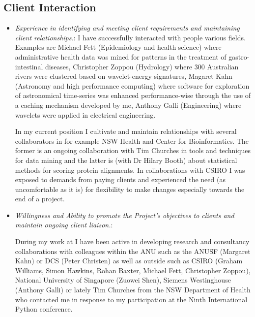 \documentclass[12pt,a4paper]{article}
\begin{document}
\subsection*{Client Interaction}
\begin{itemize} 
  \item \textit{Experience in identifying and meeting client requirements and maintaining client relationships.}:
  I have successfully interacted with people various fields.
  Examples are Michael Fett (Epidemiology and health science)
  where administrative health data was mined for patterns in the 
  treatment of gastro-intestinal diseases, 
  Christopher Zoppou (Hydrology) where 300 Australian rivers were 
  clustered based on wavelet-energy signatures,
  Magaret Kahn (Astronomy and high performance computing)
  where software for exploration of astronomical time-series was enhanced
  performance-wise through the use of a caching mechanism developed by me,
  Anthony Galli (Engineering) where wavelets were applied in 
  electrical engineering.
  
  
  In my current position I cultivate and maintain relationships with several
  collaborators in for example NSW Health and Center for Bioinformatics.
  The former is an ongoing collaboration with Tim Churches in tools and 
  techniques for data mining and the latter is (with Dr Hilary Booth) 
  about statistical methods for scoring protein alignments.
  In collaborations with CSIRO I was exposed to demands from
  paying clients and experienced the need (as uncomfortable as it is)
  for flexibility to make changes especially towards the end of a project.
  
  \item \textit{Willingness and Ability to promote the Project's objectives to clients and maintain ongoing client liaison.}:  
  
  During my work at I have been active in 
  developing research and consultancy collaborations with colleagues 
  within the ANU such as the ANUSF (Margaret Kahn) or DCS (Peter Christen) 
  as well as outside such as 
  CSIRO (Graham Williams, Simon Hawkins, Rohan Baxter, 
  Michael Fett, Christopher Zoppou), 
  National University of Singapore (Zuowei Shen), 
  Siemens Westinghouse (Anthony Galli)
  or lately Tim Churches from the NSW Department of Health who 
  contacted me in response to my participation at the Ninth International 
  Python conference. 

\end{itemize} 
\end{document}

